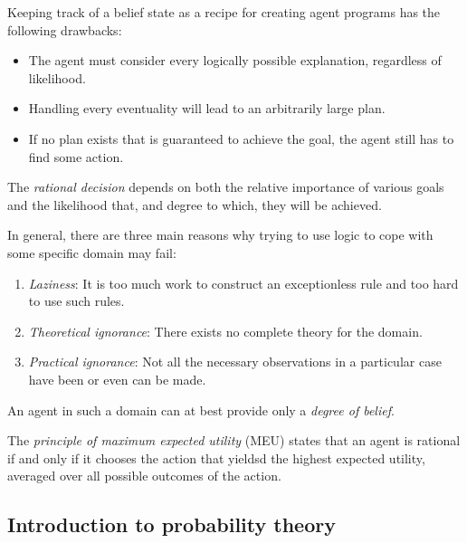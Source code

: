 \documentclass{article}
\begin{document}
\begin{lemma}
    Keeping track of a belief state as a recipe for creating agent programs
    has the following drawbacks:
    \begin{itemize}
        \item The agent must consider every logically possible explanation, regardless of likelihood.
        \item Handling every eventuality will lead to an arbitrarily large plan.
        \item If no plan exists that is guaranteed to achieve the goal, the agent still has to find some action.
    \end{itemize}
\end{lemma}

\begin{definition}
    The \emph{rational decision} depends on both the relative importance of various goals and the
    likelihood that, and degree to which, they will be achieved.
\end{definition}

\begin{theorem}
    In general, there are three main reasons why trying to use logic
    to cope with some specific domain may fail:
    \begin{enumerate}
        \item \emph{Laziness}: It is too much work to construct an 
        exceptionless rule and too hard to use such rules.
        \item \emph{Theoretical ignorance}: There exists no complete theory for the domain.
        \item \emph{Practical ignorance}: Not all the necessary observations 
        in a particular case have been or even can be made.
    \end{enumerate}
    An agent in such a domain can at best provide only a \emph{degree of belief}.
\end{theorem}

\begin{definition}
    The \emph{principle of maximum expected utility} (MEU) states that an agent is rational
    if and only if it chooses the action that yieldsd the highest expected utility,
    averaged over all possible outcomes of the action. 
\end{definition}

\subsection{Introduction to probability theory}
\end{document}
